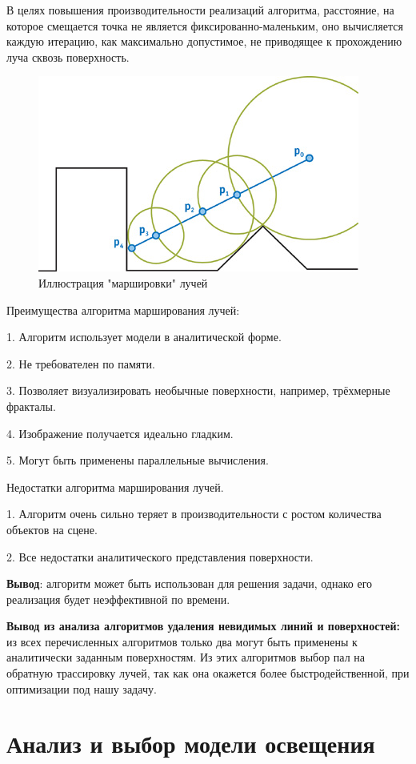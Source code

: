 В целях повышения производительности реализаций алгоритма, расстояние, на которое смещается точка не является фиксированно-маленьким, оно вычисляется каждую итерацию, как максимально допустимое, не приводящее к прохождению луча сквозь поверхность.

\begin{figure}[h]
	\centering
	\includegraphics[width=0.7\linewidth]{images/spheretrace}
	\caption{Иллюстрация "маршировки" лучей}
	\label{fig:spheretrace}
\end{figure}

Преимущества алгоритма марширования лучей:

1. Алгоритм использует модели в аналитической форме.

2. Не требователен по памяти.

3. Позволяет визуализировать необычные поверхности, например, трёхмерные фракталы.

4. Изображение получается идеально гладким.

5. Могут быть применены параллельные вычисления.

Недостатки алгоритма марширования лучей.

1.	Алгоритм очень сильно теряет в производительности с ростом количества объектов на сцене.

2.	Все недостатки аналитического представления поверхности.

\textbf{Вывод}: алгоритм может быть использован для решения задачи, однако его реализация будет неэффективной по времени.

\textbf{Вывод из анализа алгоритмов удаления невидимых линий и поверхностей:}
из всех перечисленных алгоритмов только два могут быть применены к аналитически заданным поверхностям. Из этих алгоритмов выбор пал на обратную трассировку лучей, так как она окажется более быстродейственной, при оптимизации под нашу задачу.
	
\section{Анализ и выбор модели освещения}

